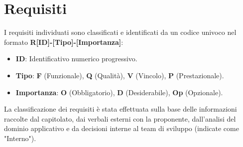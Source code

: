 \section{Requisiti}
I requisiti individuati sono classificati e identificati da un codice univoco nel formato \textbf{R[ID]-[Tipo]-[Importanza]}:
\begin{itemize}
	\item \textbf{ID}: Identificativo numerico progressivo.
	\item \textbf{Tipo}: \textbf{F} (Funzionale), \textbf{Q} (Qualità), \textbf{V} (Vincolo), \textbf{P} (Prestazionale).
	\item \textbf{Importanza}: \textbf{O} (Obbligatorio), \textbf{D} (Desiderabile), \textbf{Op} (Opzionale).
\end{itemize}

La classificazione dei requisiti è stata effettuata sulla base delle
informazioni raccolte dal capitolato, dai verbali esterni con la
proponente, dall'analisi del dominio applicativo e da decisioni
interne al team di sviluppo (indicate come "Interno").

